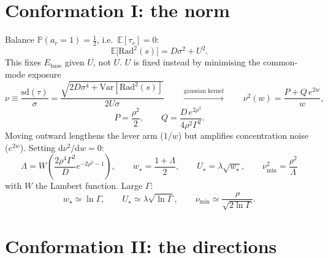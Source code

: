 \documentclass[11pt,a4paper]{article}
\newcommand{\EE}{\mathbb{E}}
\newcommand{\PP}{\mathbb{P}}
\newcommand{\Var}{\mathrm{Var}}
\newcommand{\sd}{\mathrm{sd}}
\newcommand{\Ebase}{E_{\mathrm{base}}}
\begin{document}
\section{Conformation I: the norm}

Balance $\PP(a_r=1)=\tfrac12$, i.e.\ $\EE[\tau_r]=0$:
\begin{equation}
  \EE\big[\mathrm{Rad}^2(s)\big]=D\sigma^2+U^2 .
  \label{eq:balance}
\end{equation}
This fixes $\Ebase$ given $U$, not $U$. $U$ is fixed instead by minimising the common-mode
exposure
\begin{equation}
  \nu \equiv \frac{\sd(\tau)}{\sigma}
    = \frac{\sqrt{2D\sigma^4+\Var[\mathrm{Rad}^2(s)]}}{2U\sigma}
  \qquad\overset{\text{gaussian kernel}}{\longrightarrow}\qquad
  \nu^2(w)=\frac{P+Q\,e^{2w}}{w},
  \label{eq:nu}
\end{equation}
\begin{equation}
  P=\frac{\rho^2}{2},
  \qquad
  Q=\frac{D\,e^{2\rho^2}}{4\rho^2\Gamma^2} .
\end{equation}
Moving outward lengthens the lever arm ($1/w$) but amplifies concentration noise
($e^{2w}$). Setting $\mathrm{d}\nu^2/\mathrm{d}w=0$:
\begin{equation}
  \boxed{\;
  \Lambda=W\!\left(\frac{2\rho^4\Gamma^2}{D}e^{-2\rho^2-1}\right),
  \qquad
  w_\star=\frac{1+\Lambda}{2},
  \qquad
  U_\star=\lambda\sqrt{w_\star},
  \qquad
  \nu_{\min}^2=\frac{\rho^2}{\Lambda} \;}
  \label{eq:lever}
\end{equation}
with $W$ the Lambert function. Large $\Gamma$:
\begin{equation}
  w_\star\simeq\ln\Gamma,
  \qquad
  U_\star\simeq\lambda\sqrt{\ln\Gamma},
  \qquad
  \nu_{\min}\simeq\frac{\rho}{\sqrt{2\ln\Gamma}} .
\end{equation}

\section{Conformation II: the directions}
\end{document}
